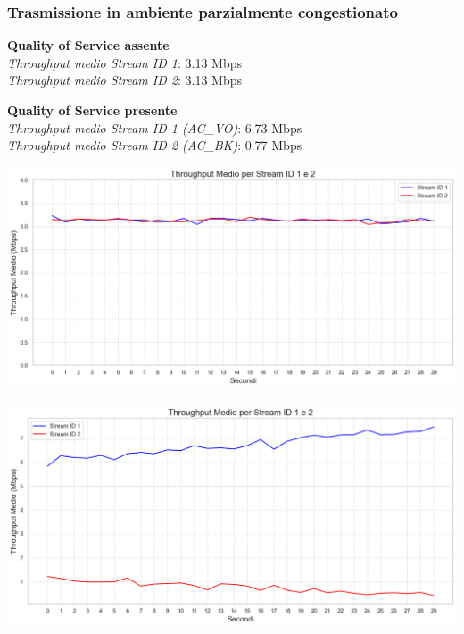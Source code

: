 \documentclass{beamer}
\begin{document}
\begin{frame}
    \frametitle{Trasmissione in ambiente parzialmente congestionato}
    
    \begin{minipage}{0.45\textwidth}
        \textbf{Quality of Service assente}\\
        \textit{Throughput medio Stream ID 1}: 3.13 Mbps\\
        \textit{Throughput medio Stream ID 2}: 3.13 Mbps\\
        
        \vspace{1cm}
        
        \textbf{Quality of Service presente}\\
        \textit{Throughput medio Stream ID 1 (AC\_VO)}: 6.73 Mbps\\
        \textit{Throughput medio Stream ID 2 (AC\_BK)}: 0.77 Mbps\\
    \end{minipage}
    \hfill
    \begin{minipage}{0.5\textwidth}
        \centering
        \begin{minipage}{\textwidth}
            \includegraphics[width=\textwidth]{t1_c1_main.png}
            \vspace{0.5cm}
        \end{minipage}
        \begin{minipage}{\textwidth}
            \includegraphics[width=\textwidth]{t2_c1_main.png}
        \end{minipage}
    \end{minipage}

\end{frame}
\end{document}
